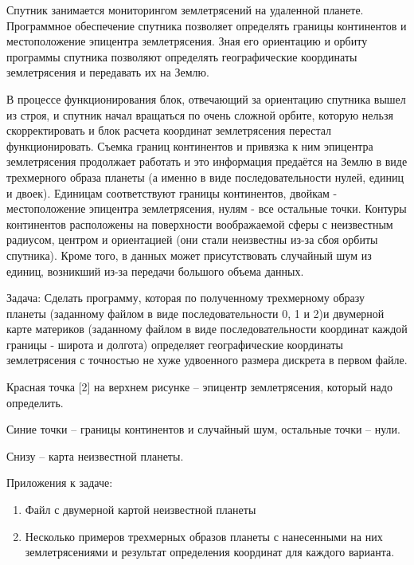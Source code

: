 
Спутник занимается мониторингом землетрясений на удаленной планете. Программное обеспечение спутника позволяет определять границы континентов и местоположение эпицентра землетрясения. Зная его ориентацию и орбиту программы спутника позволяют определять географические координаты землетрясения и передавать их на Землю.

В процессе функционирования блок, отвечающий за ориентацию спутника вышел из строя, и спутник начал вращаться по очень сложной орбите, которую нельзя скорректировать и блок расчета координат землетрясения перестал функционировать. Съемка границ континентов и привязка к ним эпицентра землетрясения продолжает работать и это информация предаётся на Землю в виде трехмерного образа планеты (а именно в виде последовательности нулей, единиц и двоек). Единицам соответствуют границы континентов, двойкам - местоположение эпицентра землетрясения, нулям - все остальные точки. Контуры континентов расположены на поверхности воображаемой сферы с неизвестным радиусом, центром и ориентацией (они стали неизвестны из-за сбоя орбиты спутника). Кроме того, в данных может присутствовать случайный шум из единиц, возникший из-за передачи большого объема данных.

Задача: Сделать программу, которая по полученному трехмерному образу планеты (заданному файлом в виде последовательности 0, 1 и 2)и двумерной карте материков (заданному файлом в виде последовательности координат каждой границы - широта и долгота) определяет географические координаты землетрясения с точностью не хуже удвоенного размера дискрета в первом файле.

\explaneSection


Красная точка [2] на верхнем рисунке -- эпицентр землетрясения, который надо определить.

Синие точки -- границы континентов и случайный шум, остальные точки -- нули.

Снизу -- карта неизвестной планеты.
 

Приложения к задаче:
\begin{enumerate}
    \item Файл с двумерной картой неизвестной планеты
    \item Несколько примеров трехмерных образов планеты с нанесенными на них землетрясениями и результат определения координат для каждого варианта.
\end{enumerate}

